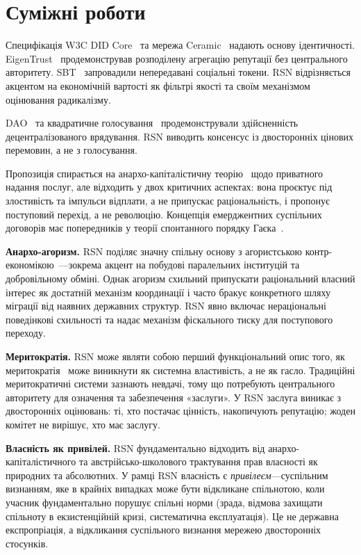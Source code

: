 \documentclass[11pt,a4paper,twocolumn]{article}
\begin{document}
\section{Суміжні роботи}

Специфікація W3C DID Core~\cite{did2022} та мережа Ceramic~\cite{ceramic2023} надають основу ідентичності. EigenTrust~\cite{kamvar2003} продемонстрував розподілену агрегацію репутації без центрального авторитету. SBT~\cite{weyl2022} запровадили непередавані соціальні токени. RSN відрізняється акцентом на економічній вартості як фільтрі якості та своїм механізмом оцінювання радикалізму.

DAO~\cite{buterin2014} та квадратичне голосування~\cite{buterin2019} продемонстрували здійсненність децентралізованого врядування. RSN виводить консенсус із двосторонніх цінових перемовин, а не з голосування.

Пропозиція спирається на анархо-капіталістичну теорію~\cite{rothbard1973,hoppe2001} щодо приватного надання послуг, але відходить у двох критичних аспектах: вона проєктує під злостивість та імпульси відплати, а не припускає раціональність, і пропонує поступовий перехід, а не революцію. Концепція емерджентних суспільних договорів має попередників у теорії спонтанного порядку Гаєка~\cite{hayek1973}.

\textbf{Анархо-агоризм.} RSN поділяє значну спільну основу з агористською контр-економікою~\cite{konkin2006}---зокрема акцент на побудові паралельних інституцій та добровільному обміні. Однак агоризм схильний припускати раціональний власний інтерес як достатній механізм координації і часто бракує конкретного шляху міграції від наявних державних структур. RSN явно включає нераціональні поведінкові схильності та надає механізм фіскального тиску для поступового переходу.

\textbf{Меритократія.} RSN може являти собою перший функціональний опис того, як меритократія~\cite{young1958} може виникнути як системна властивість, а не як гасло. Традиційні меритократичні системи зазнають невдачі, тому що потребують центрального авторитету для означення та забезпечення «заслуги». У RSN заслуга виникає з двосторонніх оцінювань: ті, хто постачає цінність, накопичують репутацію; жоден комітет не вирішує, хто має заслугу.

\textbf{Власність як привілей.} RSN фундаментально відходить від анархо-капіталістичного та австрійсько-школового трактування прав власності як природних та абсолютних. У рамці RSN власність є \emph{привілеєм}---суспільним визнанням, яке в крайніх випадках може бути відкликане спільнотою, коли учасник фундаментально порушує спільні норми (зрада, відмова захищати спільноту в екзистенційній кризі, систематична експлуатація). Це не державна експропріація, а відкликання суспільного визнання мережею двосторонніх стосунків.
\end{document}
